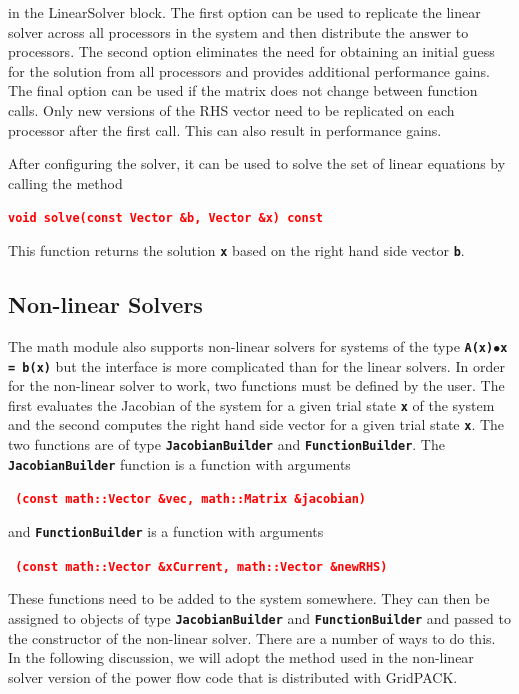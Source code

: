 \documentclass[12pt]{report} %
\begin{document}
in the LinearSolver block. The first option can be used to replicate the linear solver across all processors in the system and then distribute the answer to processors. The second option eliminates the need for obtaining an initial guess for the solution from all processors and provides additional performance gains. The final option can be used if the matrix does not change between function calls. Only new versions of the RHS vector need to be replicated on each processor after the first call. This can also result in performance gains.

After configuring the solver, it can be used to solve the set of linear equations by calling the method

\textcolor{red}{\texttt{\textbf{void solve(const Vector \&b, Vector \&x) const}}}

This function returns the solution \texttt{\textbf{x}} based on the right hand side vector \texttt{\textbf{b}}.

\subsection{Non-linear Solvers}

The math module also supports non-linear solvers for systems of the type \texttt{\textbf{A(x)$\boldsymbol{\mathrm{\bullet}}$x = b(x)}} but the interface is more complicated than for the linear solvers. In order for the non-linear solver to work, two functions must be defined by the user. The first evaluates the Jacobian of the system for a given trial state \texttt{\textbf{x}} of the system and the second computes the right hand side vector for a given trial state \texttt{\textbf{x}}. The two functions are of type \texttt{\textbf{JacobianBuilder}} and \texttt{\textbf{FunctionBuilder}}. The \texttt{\textbf{JacobianBuilder}} function is a function with arguments

\textcolor{red}{\texttt{\textbf{    (const math::Vector \&vec, math::Matrix \&jacobian)}}}

and \texttt{\textbf{FunctionBuilder}} is a function with arguments

\textcolor{red}{\texttt{\textbf{    (const math::Vector \&xCurrent, math::Vector \&newRHS)}}}

These functions need to be added to the system somewhere. They can then be assigned to objects of type \texttt{\textbf{JacobianBuilder}} and \texttt{\textbf{FunctionBuilder}} and passed to the constructor of the non-linear solver. There are a number of ways to do this. In the following discussion, we will adopt the method used in the non-linear solver version of the power flow code that is distributed with GridPACK.
\end{document}

